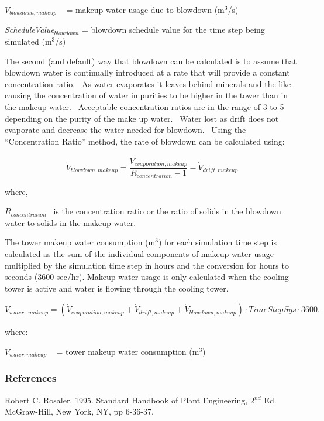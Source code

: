 \({\dot V_{blowdown,makeup}}\) ~ = makeup water usage due to blowdown (m\(^{3}\)/s)

\emph{ScheduleValue\(_{blowdown}\)} = blowdown schedule value for the time step being simulated (m\(^{3}\)/s)

The second (and default) way that blowdown can be calculated is to assume that blowdown water is continually introduced at a rate that will provide a constant concentration ratio.~ As water evaporates it leaves behind minerals and the like causing the concentration of water impurities to be higher in the tower than in the makeup water.~ Acceptable concentration ratios are in the range of 3 to 5 depending on the purity of the make up water.~ Water lost as drift does not evaporate and decrease the water needed for blowdown.~ Using the ``Concentration Ratio'' method, the rate of blowdown can be calculated using:

\begin{equation}
{\dot V_{blowdown,makeup}} = \frac{{{{\dot V}_{evaporation,makeup}}}}{{{R_{concentration}} - 1}} - {\dot V_{drift,makeup}}
\end{equation}

where,

\({R_{concentration}}\) ~is the concentration ratio or the ratio of solids in the blowdown water to solids in the makeup water.

The tower makeup water consumption (m\(^{3}\)) for each simulation time step is calculated as the sum of the individual components of makeup water usage multiplied by the simulation time step in hours and the conversion for hours to seconds (3600 sec/hr). Makeup water usage is only calculated when the cooling tower is active and water is flowing through the cooling tower.

\begin{equation}
{V_{water,\;makeup}} = \left( {{{\dot V}_{evaporation,makeup}} + {{\dot V}_{drift,makeup}} + {{\dot V}_{blowdown,makeup}}} \right)\cdot TimeStepSys\cdot 3600.
\end{equation}

where:

\({V_{water,makeup}}\) ~ = tower makeup water consumption (m\(^{3}\))

\subsubsection{References}\label{references-2-003}

Robert C. Rosaler. 1995. Standard Handbook of Plant Engineering, 2\(^{nd}\) Ed. McGraw-Hill, New York, NY, pp 6-36-37.

